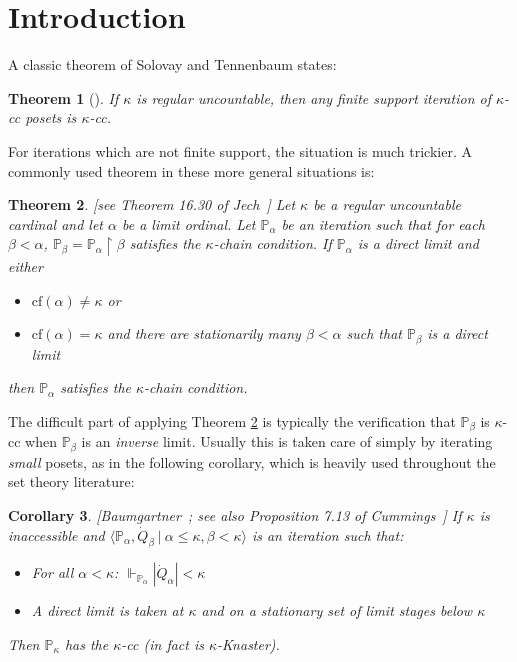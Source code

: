 \documentclass{amsart}
\newtheorem{theorem}{Theorem}
\newtheorem{corollary}[theorem]{Corollary}
\begin{document}
\tableofcontents




\section{Introduction}



A classic theorem of Solovay and Tennenbaum states:
\begin{theorem}[\cite{MR0294139}]\label{thm_FiniteSupport}
If $\kappa$ is regular uncountable, then any finite support iteration of $\kappa$-cc posets is $\kappa$-cc.
\end{theorem}




For iterations which are not finite support, the situation is much trickier.  A commonly used theorem in these more general situations is:
\begin{theorem}\label{thm_Jech1630}[see Theorem 16.30 of Jech~\cite{MR1940513}]
Let $\kappa$ be a regular uncountable cardinal and let $\alpha$ be a limit ordinal.  Let $\mathbb{P}_\alpha$ be an iteration such that for each $\beta < \alpha$, $\mathbb{P}_\beta = \mathbb{P}_\alpha \restriction \beta$ satisfies the $\kappa$-chain condition.  If $\mathbb{P}_\alpha$ is a direct limit and either
\begin{itemize}
 \item $\text{cf}(\alpha) \ne \kappa$ or
 \item $\text{cf}(\alpha) = \kappa$ and there are stationarily many $\beta < \alpha$ such that $\mathbb{P}_\beta$ is a direct limit
\end{itemize}
then $\mathbb{P}_\alpha$ satisfies the $\kappa$-chain condition.
\end{theorem}

The difficult part of applying Theorem \ref{thm_Jech1630} is typically the verification that $\mathbb{P}_\beta$ is $\kappa$-cc when $\mathbb{P}_\beta$ is an \emph{inverse} limit.  Usually this is taken care of simply by iterating \emph{small} posets, as in the following corollary, which is heavily used throughout the set theory literature:
\begin{corollary}\label{cor_IterateSmallPosets}[Baumgartner~\cite{MR823775}; see also Proposition 7.13 of Cummings~\cite{MR2768691}]
If $\kappa$ is inaccessible and $\langle \mathbb{P}_\alpha, \dot{Q}_\beta \ | \ \alpha \le \kappa, \beta < \kappa \rangle$ is an iteration such that:
\begin{itemize}
 \item For all $\alpha < \kappa$:  $\Vdash_{\mathbb{P}_\alpha} |\dot{Q}_\alpha| < \kappa$
 \item A direct limit is taken at $\kappa$ and on a stationary set of limit stages
below $\kappa$
\end{itemize}
Then $\mathbb{P}_\kappa$ has the $\kappa$-cc (in fact is $\kappa$-Knaster).
\end{corollary}
\end{document}

